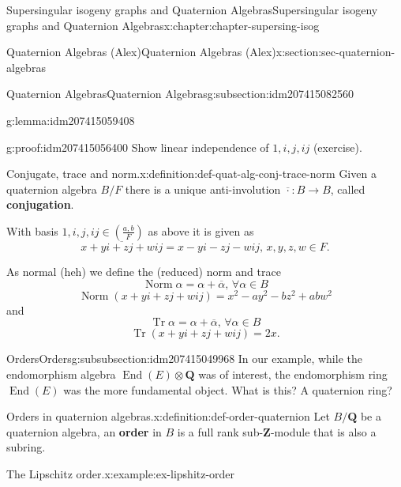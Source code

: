 \documentclass[oneside,10pt,]{book}
\newcommand{\terminology}[1]{\textbf{#1}}
\numberwithin{equation}{section}
\newcommand{\legendre}[2]{\left(\frac{#1}{#2}\right)}
\newcommand{\ZZ}{\mathbf{Z}}
\newcommand{\QQ}{\mathbf{Q}}
\DeclareMathOperator{\End}{End}
\DeclareMathOperator{\norm}{Norm}
\DeclareMathOperator{\trace}{Tr}
\begin{document}
\begin{chapterptx}{Supersingular isogeny graphs and Quaternion Algebras}{}{Supersingular isogeny graphs and Quaternion Algebras}{}{}{x:chapter:chapter-supersing-isog}
\begin{sectionptx}{Quaternion Algebras (Alex)}{}{Quaternion Algebras (Alex)}{}{}{x:section:sec-quaternion-algebras}
\begin{subsectionptx}{Quaternion Algebras}{}{Quaternion Algebras}{}{}{g:subsection:idm207415082560}
\begin{introduction}{}
\begin{lemma}{}{}{g:lemma:idm207415059408}
\end{lemma}
\begin{proofptx}{}{g:proof:idm207415056400}
Show linear independence of \(1,i,j,ij\) (exercise).%
\end{proofptx}
\begin{definition}{Conjugate, trace and norm.}{x:definition:def-quat-alg-conj-trace-norm}%
Given a quaternion algebra \(B/F\) there is a unique anti-involution \(\overline \cdot \colon B \to B\), called \terminology{conjugation}.%
\par
With basis \(1,i,j,ij\in \legendre{a,b}{F}\) as above it is given as%
\begin{equation*}
\overline {x + yi + zj + w ij} = x - yi - zj - w ij,\,x,y,z,w\in F\text{.}
\end{equation*}
%
\par
As normal (heh) we define the (reduced) norm and trace%
\begin{equation*}
\norm \alpha =  \alpha + \overline \alpha,\,\forall \alpha \in B
\end{equation*}
%
\begin{equation*}
\norm(x + yi + zj + w ij) = x^2 - ay^2 - b z^2 + ab w^2
\end{equation*}
and%
\begin{equation*}
\trace \alpha =  \alpha + \overline \alpha,\,\forall \alpha \in B
\end{equation*}
%
\begin{equation*}
\trace (x + yi + zj + w ij) = 2x\text{.}
\end{equation*}
%
\end{definition}
\end{introduction}%
%
%
\typeout{************************************************}
\typeout{************************************************}
%
\begin{subsubsectionptx}{Orders}{}{Orders}{}{}{g:subsubsection:idm207415049968}
In our example, while the endomorphism algebra \(\End(E)\otimes \QQ\) was of interest, the endomorphism ring \(\End(E)\) was the more fundamental object. What is this? A quaternion ring?%
\begin{definition}{Orders in quaternion algebras.}{x:definition:def-order-quaternion}%
Let \(B/\QQ\) be a quaternion algebra, an \terminology{order} in \(B\) is a full rank sub-\(\ZZ\)-module that is also a subring.%
\end{definition}
\begin{example}{The Lipschitz order.}{x:example:ex-lipshitz-order}%

\end{example}
\end{subsubsectionptx}
\end{subsectionptx}
\end{sectionptx}
\end{chapterptx}
\end{document}
